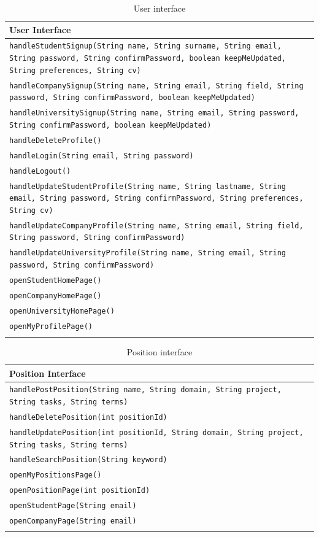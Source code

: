 \renewcommand{\arraystretch}{1.5}
\begin{longtable}{|p{14.5cm}|}
    \hline
    \cellcolor{custompurple}\textbf{User Interface} \\ \hline
    \texttt{handleStudentSignup(String name, String surname, String email, String password, String confirmPassword, boolean keepMeUpdated, String preferences, String cv)} \\ \hline
    \texttt{handleCompanySignup(String name, String email, String field, String password, String confirmPassword, boolean keepMeUpdated)} \\ \hline
    \texttt{handleUniversitySignup(String name, String email, String password, String confirmPassword, boolean keepMeUpdated)} \\ \hline
    \texttt{handleDeleteProfile()} \\ \hline
    \texttt{handleLogin(String email, String password)} \\ \hline
    \texttt{handleLogout()} \\ \hline
    \texttt{handleUpdateStudentProfile(String name, String lastname, String email, String password, String confirmPassword, String preferences, String cv)} \\ \hline
    \texttt{handleUpdateCompanyProfile(String name, String email, String field, String password, String confirmPassword)} \\ \hline
    \texttt{handleUpdateUniversityProfile(String name, String email, String password, String confirmPassword)} \\ \hline
    \texttt{openStudentHomePage()} \\ \hline
    \texttt{openCompanyHomePage()} \\ \hline
    \texttt{openUniversityHomePage()} \\ \hline
    \texttt{openMyProfilePage()} \\ \hline
\caption{User interface}
\end{longtable}

\renewcommand{\arraystretch}{1.5}
\begin{longtable}{|p{14.5cm}|}
    \hline
    \cellcolor{customblue}\textbf{Position Interface} \\ \hline
    \texttt{handlePostPosition(String name, String domain, String project, String tasks, String terms)} \\ \hline
    \texttt{handleDeletePosition(int positionId)} \\ \hline
    \texttt{handleUpdatePosition(int positionId, String domain, String project, String tasks, String terms)} \\ \hline
    \texttt{handleSearchPosition(String keyword)} \\ \hline
    \texttt{openMyPositionsPage()} \\ \hline
    \texttt{openPositionPage(int positionId)} \\ \hline
    \texttt{openStudentPage(String email)} \\ \hline
    \texttt{openCompanyPage(String email)} \\ \hline
\caption{Position interface}
\end{longtable}

